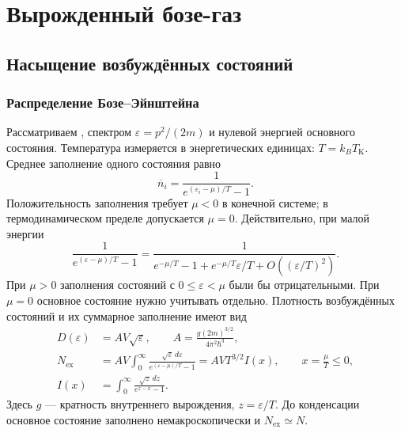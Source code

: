 \documentclass[../final.tex]{subfiles}
\begin{document}
\ifSubfilesClassLoaded{\setcounter{chapter}{2}\setcounter{section}{6}}{}

\chapter{Вырожденный бозе-газ}

\section{Насыщение возбуждённых состояний}
\subsection{Распределение Бозе--Эйнштейна}
Рассматриваем , спектром $\varepsilon=p^2/(2m)$ и нулевой энергией основного состояния.
Температура измеряется в энергетических единицах: $T=k_BT_{\mathrm K}$.
Среднее заполнение одного состояния равно
\begin{equation*}
 \overline n_i=\frac1{e^{(\varepsilon_i-\mu)/T}-1}.
\end{equation*}
Положительность заполнения требует $\mu<0$ в конечной системе;
в термодинамическом пределе допускается $\mu=0$.
Действительно, при малой энергии
\begin{equation*}
 \frac1{e^{(\varepsilon-\mu)/T}-1}
 =\frac1{e^{-\mu/T}-1+e^{-\mu/T}\varepsilon/T
 +O((\varepsilon/T)^2)}.
\end{equation*}
При $\mu>0$ заполнения состояний с $0\leq\varepsilon<\mu$ были бы
отрицательными. При $\mu=0$ основное состояние нужно учитывать отдельно.
Плотность возбуждённых состояний и их суммарное заполнение имеют вид
\begin{align*}
 D(\varepsilon)&=AV\sqrt\varepsilon,\qquad
 A=\frac{g(2m)^{3/2}}{4\pi^2\hbar^3},\\
 N_{\mathrm{ex}}&=AV\int_0^\infty
 \frac{\sqrt\varepsilon\,d\varepsilon}{e^{(\varepsilon-\mu)/T}-1}
 =AVT^{3/2}I(x),\qquad x=\frac\mu T\leq0,\\
 I(x)&=\int_0^\infty\frac{\sqrt z\,dz}{e^{z-x}-1}.
\end{align*}
Здесь $g$ --- кратность внутреннего вырождения, $z=\varepsilon/T$.
До конденсации основное состояние заполнено немакроскопически и
$N_{\mathrm{ex}}\simeq N$.

\clearpage
\end{document}
